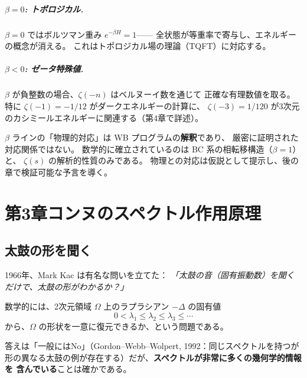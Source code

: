 \documentclass[11pt,a4paper]{article}
\theoremstyle{definition}
\begin{document}
\paragraph{$\beta = 0$: トポロジカル.}
$\beta = 0$ ではボルツマン重み $e^{-\beta H} = 1$——
全状態が等重率で寄与し、エネルギーの概念が消える。
これはトポロジカル場の理論（TQFT）に対応する。

\paragraph{$\beta < 0$: ゼータ特殊値.}
$\beta$ が負整数の場合、$\zeta(-n)$ はベルヌーイ数を通じて
正確な有理数値を取る。特に $\zeta(-1) = -1/12$ がダークエネルギーの計算に、
$\zeta(-3) = 1/120$ が3次元のカシミールエネルギーに関連する（第4章で詳述）。

\begin{hypbox}[注意: 仮説の範囲]
$\beta$ ラインの「物理的対応」は WB プログラムの\textbf{解釈}であり、
厳密に証明された対応関係ではない。
数学的に確立されているのは BC 系の相転移構造（$\beta = 1$）と、
$\zeta(s)$ の解析的性質のみである。
物理との対応は仮説として提示し、後の章で検証可能な予言を導く。
\end{hypbox}


\chapter*{第3章\quad コンヌのスペクトル作用原理}
\setcounter{section}{0}
\renewcommand{\thesection}{3.\arabic{section}}

\section{太鼓の形を聞く}
\label{sec:3.1}

1966年、Mark Kac は有名な問いを立てた：
\textit{「太鼓の音（固有振動数）を聞くだけで、太鼓の形がわかるか？」}

数学的には、2次元領域 $\Omega$ 上のラプラシアン $-\Delta$ の固有値
\[
  0 < \lambda_1 \leq \lambda_2 \leq \lambda_3 \leq \cdots
\]
から、$\Omega$ の形状を一意に復元できるか、という問題である。

答えは「一般にはNo」（Gordon--Webb--Wolpert, 1992：同じスペクトルを持つが
形の異なる太鼓の例が存在する）だが、\textbf{スペクトルが非常に多くの幾何学的情報を
含んでいる}ことは確かである。
\end{document}
